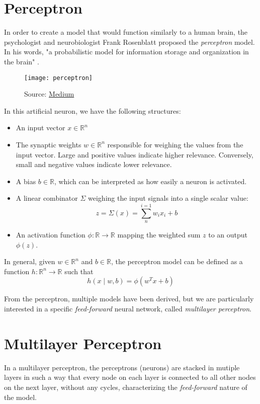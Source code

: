 \section{Perceptron}
In order to create a model that would function similarly to a human brain, the psychologist and neurobiologist Frank Rosenblatt proposed the \textit{perceptron} model. In his words, "a probabilistic model for information storage and organization in the brain" \cite{rosenblatt:perceptron}.
\begin{figure}[H]
    \texttt{[image: perceptron]}
    \caption{Source: \href{https://medium.com/@stanleydukor/neural-representation-of-and-or-not-xor-and-xnor-logic-gates-perceptron-algorithm-b0275375fea1}{Medium}}
\end{figure}
In this artificial neuron, we have the following structures:
\begin{itemize}
    \item An input vector $x \in \mathbb{R}^n$
    \item The synaptic weights $w \in \mathbb{R}^n$ responsible for weighing the values from the input vector. Large and positive values indicate higher relevance. Conversely, small and negative values indicate lower relevance.
    \item A bias $b \in \mathbb{R}$, which can be interpreted as how easily a neuron is activated.
    \item A linear combinator $\Sigma$ weighing the input signals into a single scalar value:
    \[
        z = \Sigma(x) = \sum^{i=1}_{n}w_i x_i + b   
    \]
    \item An activation function $\phi \colon \mathbb{R} \to \mathbb{R}$ mapping the weighted sum $z$ to an output $\phi(z)$.
\end{itemize}
In general, given $w \in \mathbb{R}^n$ and $b \in \mathbb{R}$, the perceptron model can be defined as a function $h \colon \mathbb{R}^n \to \mathbb{R}$ such that
\[
    h(x \mid w, b) = \phi(w^Tx + b)    
\]

From the perceptron, multiple models have been derived, but we are particularly interested in a specific \textit{feed-forward} neural network, called \textit{multilayer perceptron}.

\section{Multilayer Perceptron}
In a multilayer perceptron, the perceptrons (neurons) are stacked in mutiple layers in such a way that every node on each layer is connected to all other nodes on the next layer, without any cycles, characterizing the \textit{feed-forward} nature of the model.

